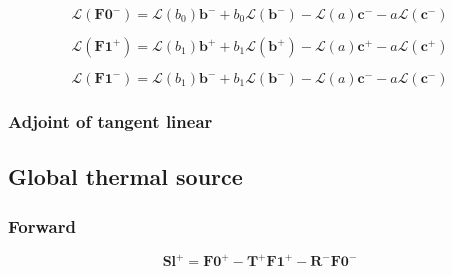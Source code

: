 \begin{equation}
\mathcal{L}(\mathbf{F0}^{-}) = \mathcal{L}(b_{0}) \mathbf{b}^{-} + b_{0} \mathcal{L}(\mathbf{b}^{-}) - \mathcal{L}(a) \mathbf{c}^{-} - a \mathcal{L}(\mathbf{c}^{-})
\label{eq:thermal_source_local_thermal_source-tangent_linear-f0_m_l}
\end{equation}

\begin{equation}
\mathcal{L}(\mathbf{F1}^{+}) = \mathcal{L}(b_{1}) \mathbf{b}^{+} + b_{1} \mathcal{L}(\mathbf{b}^{+}) - \mathcal{L}(a) \mathbf{c}^{+} - a \mathcal{L}(\mathbf{c}^{+})
\label{eq:thermal_source_local_thermal_source-tangent_linear-f1_p_l}
\end{equation}

\begin{equation}
\mathcal{L}(\mathbf{F1}^{-}) = \mathcal{L}(b_{1}) \mathbf{b}^{-} + b_{1} \mathcal{L}(\mathbf{b}^{-}) - \mathcal{L}(a) \mathbf{c}^{-} - a \mathcal{L}(\mathbf{c}^{-})
\label{eq:thermal_source_local_thermal_source-tangent_linear-f1_m_l}
\end{equation}


%
\subsubsection{Adjoint of tangent linear}
\label{sec:thermal_source_local_thermal_source-adjoint_of_tangent_linear}


%
\subsection{Global thermal source}
\label{sec:thermal_source_global_thermal_source}

\subsubsection{Forward}
\label{sec:thermal_source_global_thermal_source-forward}

\begin{equation}
\mathbf{Sl}^{+} = \mathbf{F0}^{+} - \mathbf{T}^{+}\mathbf{F1}^{+} - \mathbf{R}^{-}\mathbf{F0}^{-}
\label{eq:thermal_source_global_thermal_source-forward-sl_p}
\end{equation}

